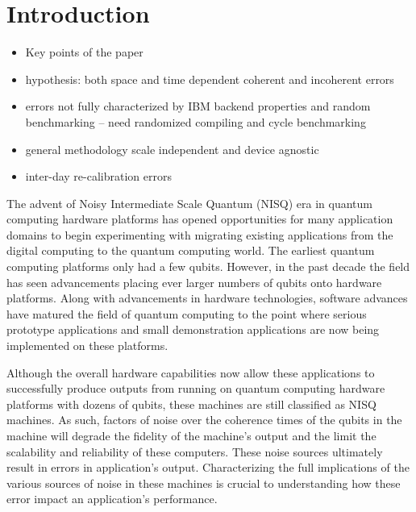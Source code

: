 \documentclass[main.tex]{subfiles}
\begin{document}
\section{Introduction}
\label{sec:intro}

\begin{itemize}
\item Key points of the paper
\item hypothesis: both space and time dependent coherent and incoherent errors
\item 	errors not fully characterized by IBM backend properties and random benchmarking – need randomized compiling and cycle benchmarking
\item  general methodology scale independent and device agnostic
\item inter-day re-calibration errors 
\end{itemize}

The advent of Noisy Intermediate Scale Quantum (NISQ) era in quantum computing hardware platforms has opened opportunities for many application domains to begin experimenting with migrating existing applications from the digital computing to the quantum computing world.  The earliest quantum computing platforms only had a few qubits.  However, in the past decade the field has seen advancements placing ever larger numbers of qubits onto hardware platforms.  Along with advancements in hardware technologies, software advances have matured the field of quantum computing to the point where serious prototype applications and small demonstration applications are now being implemented on these platforms.  

Although the overall hardware capabilities now allow these applications to successfully produce outputs from running on quantum computing hardware platforms with dozens of qubits, these machines are still classified as NISQ machines.  As such, factors of noise over the coherence times of the qubits in the machine will degrade the fidelity of the machine’s output and the limit the scalability and reliability of these computers.  These noise sources ultimately result in errors in application’s output.  Characterizing the full implications of the various sources of noise in these machines is crucial to understanding how these error impact an application’s performance.
\end{document}
